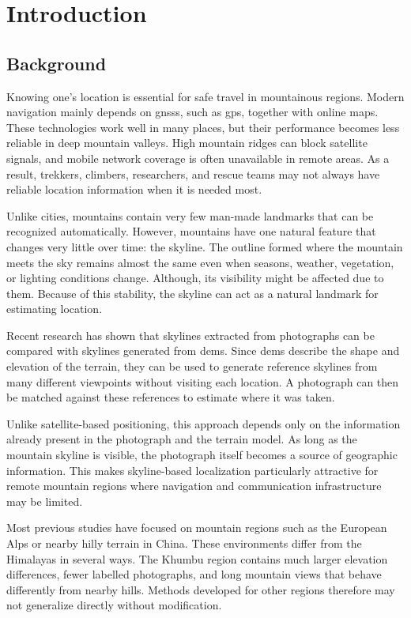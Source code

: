 \chapter{Introduction}

\section{Background}

Knowing one's location is essential for safe travel in mountainous regions. Modern navigation mainly depends on \Glspl{gnss}, such as \gls{gps}, together with online maps. These technologies work well in many places, but their performance becomes less reliable in deep mountain valleys. High mountain ridges can block satellite signals, and mobile network coverage is often unavailable in remote areas. As a result, trekkers, climbers, researchers, and rescue teams may not always have reliable location information when it is needed most.

Unlike cities, mountains contain very few man-made landmarks that can be recognized automatically. However, mountains have one natural feature that changes very little over time: the skyline. The outline formed where the mountain meets the sky remains almost the same even when seasons, weather, vegetation, or lighting conditions change. Although, its visibility might be affected due to them. Because of this stability, the skyline can act as a natural landmark for estimating location.

Recent research has shown that skylines extracted from photographs can be compared with skylines generated from \Glspl{dem}. Since \Glspl{dem} describe the shape and elevation of the terrain, they can be used to generate reference skylines from many different viewpoints without visiting each location. A photograph can then be matched against these references to estimate where it was taken.

Unlike satellite-based positioning, this approach depends only on the information already present in the photograph and the terrain model. As long as the mountain skyline is visible, the photograph itself becomes a source of geographic information. This makes skyline-based localization particularly attractive for remote mountain regions where navigation and communication infrastructure may be limited.

Most previous studies have focused on mountain regions such as the European Alps or nearby hilly terrain in China. These environments differ from the Himalayas in several ways. The Khumbu region contains much larger elevation differences, fewer labelled photographs, and long mountain views that behave differently from nearby hills. Methods developed for other regions therefore may not generalize directly without modification.

